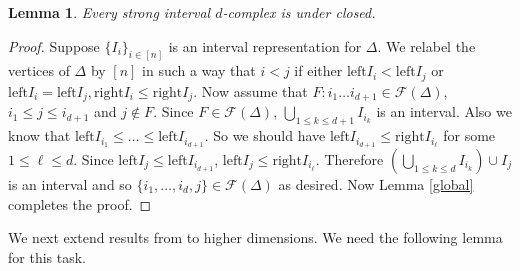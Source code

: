 \documentclass[12pt,reqno]{amsart}
\theoremstyle{plain}
\newtheorem{lemma}[theorem]{Lemma}
\theoremstyle{definition}
\numberwithin{equation}{section}
\begin{document}
\begin{lemma}\label{1.2}
Every strong interval $d$-complex is under closed.
\end{lemma}
\begin{proof}
Suppose $\{I_i\}_{i\in [n]}$ is an interval representation for $\Delta$. We relabel the vertices of $\Delta$ by $[n]$ in such a way that $i<j$ if either $\mathrm{left}I_i<\mathrm{left}I_j$ or $\mathrm{left}I_i=\mathrm{left}I_j, \mathrm{right}I_i\leq\mathrm{right}I_j$. Now assume that $F:  i_1\dots i_{d+1}\in \mathcal{F}(\Delta )$, $i_1\leq j\leq i_{d+1}$ and  $j\notin F$. Since $F\in \mathcal{F}(\Delta)$, $\bigcup_{1\leq k \leq d+1}I_{i_k}$ is an interval. Also we know that $ \mathrm{left}I_{i_1}\leq \dots \leq \mathrm{left}I_{i_{d+1}}$. So we should have $\mathrm{left}I_{i_{d+1}}\leq \mathrm{right}I_{i_\ell}$ for some $1\leq \ell \leq d$. Since $\mathrm{left}I_j\leq \mathrm{left}I_{i_{d+1}}$, $\mathrm{left}I_{j}\leq \mathrm{right}I_{i_\ell}$. Therefore $(\bigcup_{1\leq k \leq d} I_{i_k})\cup I_j$ is an interval and so $\{i_1, \dots , i_d, j\}\in \mathcal{F}(\Delta )$ as desired. Now Lemma \ref{global} completes the proof.
\end{proof}

We next extend results from \cite{C+R} to higher dimensions. We need the following lemma for this task.
\end{document}
